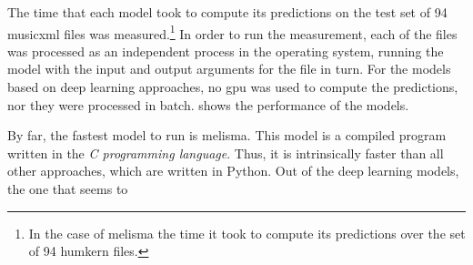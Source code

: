 
The time that each model took to compute its predictions on
the test set of 94 \gls{musicxml} files was
measured.\footnote{In the case of \gls{melisma} the time it
took to compute its predictions over the set of 94
\gls{humkern} files.} In order to run the measurement, each
of the files was processed as an independent process in the
operating system, running the model with the input and
output arguments for the file in turn. For the models based
on deep learning approaches, no \gls{gpu} was used to
compute the predictions, nor they were processed in batch.
 shows the performance of the
models.


By far, the fastest model to run is \gls{melisma}. This
model is a compiled program written in the \emph{C
programming language}. Thus, it is intrinsically faster than
all other approaches, which are written in Python. Out of
the deep learning models, the one that seems to 
